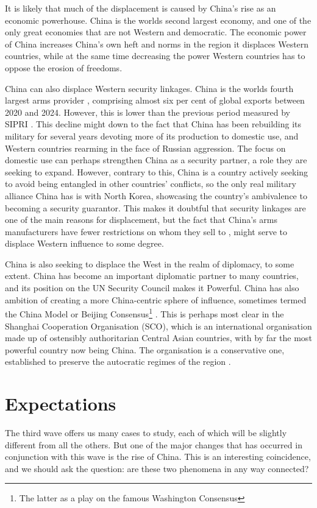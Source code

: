 It is likely that much of the displacement is caused by China's rise as an economic powerhouse. China is the worlds second largest economy, and one of the only great economies that are not Western and democratic. The economic power of China increases China's own heft and norms in the region it displaces Western countries, while at the same time decreasing the power Western countries has to oppose the erosion of freedoms. 

China can also displace Western security linkages. China is the worlds fourth largest arms provider \citep{george_trends_2025, gunter_chinas_2024}, comprising almost six per cent of global exports between 2020 and 2024. However, this is lower than the previous period measured by SIPRI \citep{george_trends_2025}. This decline might down to the fact that China has been rebuilding its military for several years devoting more of its production to domestic use, and Western countries rearming in the face of Russian aggression. The focus on domestic use can perhaps strengthen China as a security partner, a role they are seeking to expand. However, contrary to this, China is a country actively seeking to avoid being entangled in other countries' conflicts, so the only real military alliance China has is with North Korea, showcasing the country's ambivalence to becoming a security guarantor. This makes it doubtful that security linkages are one of the main reasons for displacement, but the fact that China's arms manufacturers have fewer restrictions on whom they sell to \citep{gunter_chinas_2024}, might serve to displace Western influence to some degree.

China is also seeking to displace the West in the realm of diplomacy, to some extent. China has become an important diplomatic partner to many countries, and its position on the UN Security Council makes it Powerful. China has also ambition of creating a more China-centric sphere of influence, sometimes termed the China Model or Beijing Consensus\footnote{The latter as a play on the famous Washington Consensus} \citep{ambrosio_rise_2012, economy_exporting_2020}. This is perhaps most clear in the Shanghai Cooperation Organisation (SCO), which is an international organisation made up of ostensibly authoritarian Central Asian countries, with by far the most powerful country now being China. The organisation is a conservative one, established to preserve the autocratic regimes of the region \citep[p. 1322]{ambrosio_catching_2008}. 

\section{Expectations}
The third wave offers us many cases to study, each of which will be slightly different from all the others. But one of the major changes that has occurred in conjunction with this wave is the rise of China. This is an interesting coincidence, and we should ask the question: are these two phenomena in any way connected?

